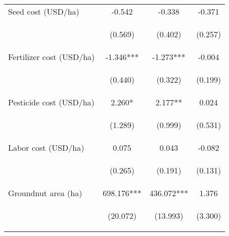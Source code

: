 \begin{center}
\begin{tabular}{lccc}
Seed cost (USD/ha) & -0.542 & -0.338 & -0.371 \\
\vspace{4pt} & \begin{footnotesize}(0.569)\end{footnotesize} & \begin{footnotesize}(0.402)\end{footnotesize} & \begin{footnotesize}(0.257)\end{footnotesize} \\
Fertilizer cost (USD/ha) & -1.346*** & -1.273*** & -0.004 \\
\vspace{4pt} & \begin{footnotesize}(0.440)\end{footnotesize} & \begin{footnotesize}(0.322)\end{footnotesize} & \begin{footnotesize}(0.199)\end{footnotesize} \\
Pesticide cost (USD/ha) & 2.260* & 2.177** & 0.024 \\
\vspace{4pt} & \begin{footnotesize}(1.289)\end{footnotesize} & \begin{footnotesize}(0.999)\end{footnotesize} & \begin{footnotesize}(0.531)\end{footnotesize} \\
Labor cost (USD/ha) & 0.075 & 0.043 & -0.082 \\
\vspace{4pt} & \begin{footnotesize}(0.265)\end{footnotesize} & \begin{footnotesize}(0.191)\end{footnotesize} & \begin{footnotesize}(0.131)\end{footnotesize} \\
Groundnut area (ha) & 698.176*** & 436.072*** & 1.376 \\
\vspace{4pt} & \begin{footnotesize}(20.072)\end{footnotesize} & \begin{footnotesize}(13.993)\end{footnotesize} & \begin{footnotesize}(3.300)\end{footnotesize} \\

\end{tabular}
\end{center}
